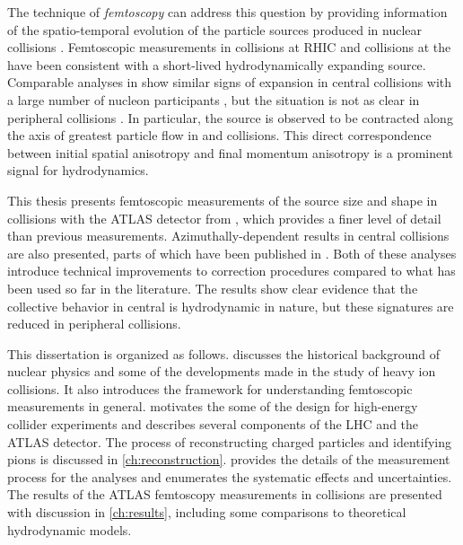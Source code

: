 The technique of \emph{femtoscopy} can address this question by providing information of the spatio-temporal evolution of the particle sources produced in nuclear collisions \cite{Lisa:2005dd}.
Femtoscopic measurements in \AuAu collisions at \ac{RHIC} and \PbPb collisions at the \lhc have been consistent with a short-lived hydrodynamically expanding source.
Comparable analyses in \pPb show similar signs of expansion in central collisions with a large number of nucleon participants \Npart, but the situation is not as clear in peripheral collisions \cite{Abelev:2014pja,Adam:2015pya}.
In particular, the source is observed to be contracted along the axis of greatest particle flow in \AuAu \cite{Adams:2003ra,Adare:2014vax,Adamczyk:2014mxp} and \PbPb \cite{Adamova:2017opl} collisions.
This direct correspondence between initial spatial anisotropy and final momentum anisotropy is a prominent signal for hydrodynamics.

This thesis presents femtoscopic measurements of the source size and shape in \pPb collisions with the ATLAS detector from , which provides a finer level of detail than previous measurements.
Azimuthally-dependent results in central \pPb collisions are also presented, parts of which have been published in .
Both of these analyses introduce technical improvements to correction procedures compared to what has been used so far in the literature.
The results show clear evidence that the collective behavior in central \pPb is hydrodynamic in nature, but these signatures are reduced in peripheral collisions.

This dissertation is organized as follows.
 discusses the historical background of nuclear physics and some of the developments made in the study of heavy ion collisions.
It also introduces the framework for understanding femtoscopic measurements in general.
 motivates the some of the design for high-energy collider experiments and describes several components of the \ac{LHC} and the ATLAS detector.
The process of reconstructing charged particles and identifying pions is discussed in \cref{ch:reconstruction}.
 provides the details of the measurement process for the analyses and enumerates the systematic effects and uncertainties.
The results of the ATLAS femtoscopy measurements in \pPb collisions are presented with discussion in \cref{ch:results}, including some comparisons to theoretical hydrodynamic models.
